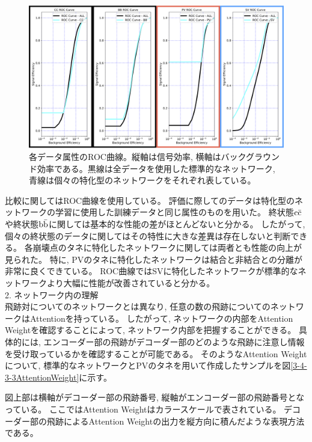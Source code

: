 \begin{figure}[htbp]
 \centering
 \includegraphics[width=1.0\textwidth, clip]{Figure/3Networks/3-4-3-2ROCCurve.png}
 \caption[各データ属性のROC曲線]{各データ属性のROC曲線。縦軸は信号効率, 横軸はバックグラウンド効率である。黒線は全データを使用した標準的なネットワーク, 青線は個々の特化型のネットワークをそれぞれ表している。}
 \label{3-4-3-2ROCCurve}
\end{figure}

比較に関してはROC曲線を使用している。
評価に際してのデータは特化型のネットワークの学習に使用した訓練データと同じ属性のものを用いた。
終状態$\rm c\bar{c}$や終状態$\rm b\bar{b}$に関しては基本的な性能の差がほとんどないと分かる。
したがって, 個々の終状態のデータに関してはその特性に大きな差異は存在しないと判断できる。
各崩壊点のタネに特化したネットワークに関しては両者とも性能の向上が見られた。
特に, PVのタネに特化したネットワークは結合と非結合との分離が非常に良くできている。
ROC曲線ではSVに特化したネットワークが標準的なネットワークより大幅に性能が改善されていると分かる。\\

2. ネットワーク内の理解\\

飛跡対についてのネットワークとは異なり, 任意の数の飛跡についてのネットワークはAttentionを持っている。
したがって, ネットワークの内部をAttention Weightを確認することによって, ネットワーク内部を把握することができる。
具体的には, エンコーダー部の飛跡がデコーダー部のどのような飛跡に注意し情報を受け取っているかを確認することが可能である。
そのようなAttention Weightについて, 標準的なネットワークとPVのタネを用いて作成したサンプルを図\ref{3-4-3-3AttentionWeight}に示す。

図上部は横軸がデコーダー部の飛跡番号, 縦軸がエンコーダー部の飛跡番号となっている。
ここではAttention Weightはカラースケールで表されている。
デコーダー部の飛跡によるAttention Weightの出力を縦方向に積んだような表現方法である。

